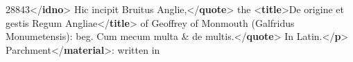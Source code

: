 \begin{shaded}
\hspace*{1em}\hspace*{1em}28843{</\textbf{idno}>}\mbox{}\newline 
\hspace*{1em}\mbox{}\newline 
{}\mbox{}\newline 
{}\mbox{}\newline 
\hspace*{1em}\mbox{}\newline 
\hspace*{1em}\hspace*{1em}Hic incipit Bruitus Anglie,{</\textbf{quote}>} the {<\textbf{title}>}De origine et gestis\mbox{}\newline 
\hspace*{1em}\hspace*{1em}\hspace*{1em}\hspace*{1em}\hspace*{1em}\hspace*{1em} Regum Angliae{</\textbf{title}>} of Geoffrey of Monmouth (Galfridus Monumetensis): beg.\mbox{}\newline 
\hspace*{1em}Cum mecum multa \& de multis.{</\textbf{quote}>} In Latin.{</\textbf{p}>}\mbox{}\newline 
{}\mbox{}\newline 
{}\mbox{}\newline 
\hspace*{1em}\mbox{}\newline 
\hspace*{1em}\hspace*{1em}Parchment{</\textbf{material}>}: written in\mbox{}\newline 

\end{shaded}
